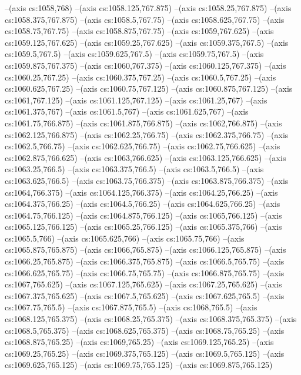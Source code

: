 --(axis cs:1058,768)
--(axis cs:1058.125,767.875)
--(axis cs:1058.25,767.875)
--(axis cs:1058.375,767.875)
--(axis cs:1058.5,767.75)
--(axis cs:1058.625,767.75)
--(axis cs:1058.75,767.75)
--(axis cs:1058.875,767.75)
--(axis cs:1059,767.625)
--(axis cs:1059.125,767.625)
--(axis cs:1059.25,767.625)
--(axis cs:1059.375,767.5)
--(axis cs:1059.5,767.5)
--(axis cs:1059.625,767.5)
--(axis cs:1059.75,767.5)
--(axis cs:1059.875,767.375)
--(axis cs:1060,767.375)
--(axis cs:1060.125,767.375)
--(axis cs:1060.25,767.25)
--(axis cs:1060.375,767.25)
--(axis cs:1060.5,767.25)
--(axis cs:1060.625,767.25)
--(axis cs:1060.75,767.125)
--(axis cs:1060.875,767.125)
--(axis cs:1061,767.125)
--(axis cs:1061.125,767.125)
--(axis cs:1061.25,767)
--(axis cs:1061.375,767)
--(axis cs:1061.5,767)
--(axis cs:1061.625,767)
--(axis cs:1061.75,766.875)
--(axis cs:1061.875,766.875)
--(axis cs:1062,766.875)
--(axis cs:1062.125,766.875)
--(axis cs:1062.25,766.75)
--(axis cs:1062.375,766.75)
--(axis cs:1062.5,766.75)
--(axis cs:1062.625,766.75)
--(axis cs:1062.75,766.625)
--(axis cs:1062.875,766.625)
--(axis cs:1063,766.625)
--(axis cs:1063.125,766.625)
--(axis cs:1063.25,766.5)
--(axis cs:1063.375,766.5)
--(axis cs:1063.5,766.5)
--(axis cs:1063.625,766.5)
--(axis cs:1063.75,766.375)
--(axis cs:1063.875,766.375)
--(axis cs:1064,766.375)
--(axis cs:1064.125,766.375)
--(axis cs:1064.25,766.25)
--(axis cs:1064.375,766.25)
--(axis cs:1064.5,766.25)
--(axis cs:1064.625,766.25)
--(axis cs:1064.75,766.125)
--(axis cs:1064.875,766.125)
--(axis cs:1065,766.125)
--(axis cs:1065.125,766.125)
--(axis cs:1065.25,766.125)
--(axis cs:1065.375,766)
--(axis cs:1065.5,766)
--(axis cs:1065.625,766)
--(axis cs:1065.75,766)
--(axis cs:1065.875,765.875)
--(axis cs:1066,765.875)
--(axis cs:1066.125,765.875)
--(axis cs:1066.25,765.875)
--(axis cs:1066.375,765.875)
--(axis cs:1066.5,765.75)
--(axis cs:1066.625,765.75)
--(axis cs:1066.75,765.75)
--(axis cs:1066.875,765.75)
--(axis cs:1067,765.625)
--(axis cs:1067.125,765.625)
--(axis cs:1067.25,765.625)
--(axis cs:1067.375,765.625)
--(axis cs:1067.5,765.625)
--(axis cs:1067.625,765.5)
--(axis cs:1067.75,765.5)
--(axis cs:1067.875,765.5)
--(axis cs:1068,765.5)
--(axis cs:1068.125,765.375)
--(axis cs:1068.25,765.375)
--(axis cs:1068.375,765.375)
--(axis cs:1068.5,765.375)
--(axis cs:1068.625,765.375)
--(axis cs:1068.75,765.25)
--(axis cs:1068.875,765.25)
--(axis cs:1069,765.25)
--(axis cs:1069.125,765.25)
--(axis cs:1069.25,765.25)
--(axis cs:1069.375,765.125)
--(axis cs:1069.5,765.125)
--(axis cs:1069.625,765.125)
--(axis cs:1069.75,765.125)
--(axis cs:1069.875,765.125)
